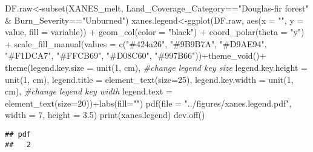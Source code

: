 \documentclass[
]{article}
\newenvironment{Shaded}{\begin{snugshade}}{\end{snugshade}}
\newcommand{\AttributeTok}[1]{\textcolor[rgb]{0.77,0.63,0.00}{#1}}
\newcommand{\CommentTok}[1]{\textcolor[rgb]{0.56,0.35,0.01}{\textit{#1}}}
\newcommand{\DecValTok}[1]{\textcolor[rgb]{0.00,0.00,0.81}{#1}}
\newcommand{\FloatTok}[1]{\textcolor[rgb]{0.00,0.00,0.81}{#1}}
\newcommand{\FunctionTok}[1]{\textcolor[rgb]{0.00,0.00,0.00}{#1}}
\newcommand{\NormalTok}[1]{#1}
\newcommand{\OtherTok}[1]{\textcolor[rgb]{0.56,0.35,0.01}{#1}}
\newcommand{\SpecialCharTok}[1]{\textcolor[rgb]{0.00,0.00,0.00}{#1}}
\newcommand{\StringTok}[1]{\textcolor[rgb]{0.31,0.60,0.02}{#1}}
\begin{document}
\begin{Shaded}
\begin{Highlighting}[]
\NormalTok{DF.raw}\OtherTok{\textless{}{-}}\FunctionTok{subset}\NormalTok{(XANES\_melt, Land\_Coverage\_Category}\SpecialCharTok{==}\StringTok{"Douglas{-}fir forest"} \SpecialCharTok{\&}\NormalTok{ Burn\_Severity}\SpecialCharTok{==}\StringTok{"Unburned"}\NormalTok{)}
\NormalTok{xanes.legend}\OtherTok{\textless{}{-}}\FunctionTok{ggplot}\NormalTok{(DF.raw, }\FunctionTok{aes}\NormalTok{(}\AttributeTok{x =} \StringTok{""}\NormalTok{, }\AttributeTok{y =}\NormalTok{ value, }\AttributeTok{fill =}\NormalTok{ variable)) }\SpecialCharTok{+}
    \FunctionTok{geom\_col}\NormalTok{(}\AttributeTok{color =} \StringTok{"black"}\NormalTok{) }\SpecialCharTok{+}
    \FunctionTok{coord\_polar}\NormalTok{(}\AttributeTok{theta =} \StringTok{"y"}\NormalTok{) }\SpecialCharTok{+} \FunctionTok{scale\_fill\_manual}\NormalTok{(}\AttributeTok{values =} \FunctionTok{c}\NormalTok{(}\StringTok{"\#424a26"}\NormalTok{, }\StringTok{"\#9B9B7A"}\NormalTok{, }\StringTok{"\#D9AE94"}\NormalTok{, }\StringTok{"\#F1DCA7"}\NormalTok{, }\StringTok{"\#FFCB69"}\NormalTok{, }\StringTok{"\#D08C60"}\NormalTok{, }\StringTok{"\#997B66"}\NormalTok{))}\SpecialCharTok{+}\FunctionTok{theme\_void}\NormalTok{()}\SpecialCharTok{+}
    \FunctionTok{theme}\NormalTok{(}\AttributeTok{legend.key.size =} \FunctionTok{unit}\NormalTok{(}\DecValTok{1}\NormalTok{, }\StringTok{\textquotesingle{}cm\textquotesingle{}}\NormalTok{), }\CommentTok{\#change legend key size}
          \AttributeTok{legend.key.height =} \FunctionTok{unit}\NormalTok{(}\DecValTok{1}\NormalTok{, }\StringTok{\textquotesingle{}cm\textquotesingle{}}\NormalTok{),  }\AttributeTok{legend.title =} \FunctionTok{element\_text}\NormalTok{(}\AttributeTok{size=}\DecValTok{25}\NormalTok{),}
          \AttributeTok{legend.key.width =} \FunctionTok{unit}\NormalTok{(}\DecValTok{1}\NormalTok{, }\StringTok{\textquotesingle{}cm\textquotesingle{}}\NormalTok{), }\CommentTok{\#change legend key width}
          \AttributeTok{legend.text =} \FunctionTok{element\_text}\NormalTok{(}\AttributeTok{size=}\DecValTok{20}\NormalTok{))}\SpecialCharTok{+}\FunctionTok{labs}\NormalTok{(}\AttributeTok{fill=}\StringTok{""}\NormalTok{)}
\FunctionTok{pdf}\NormalTok{(}\AttributeTok{file =} \StringTok{"../figures/xanes.legend.pdf"}\NormalTok{, }\AttributeTok{width =} \DecValTok{7}\NormalTok{, }\AttributeTok{height =} \FloatTok{3.5}\NormalTok{) }
\FunctionTok{print}\NormalTok{(xanes.legend)}
\FunctionTok{dev.off}\NormalTok{()}
\end{Highlighting}
\end{Shaded}

\begin{verbatim}
## pdf 
##   2
\end{verbatim}
\end{document}

